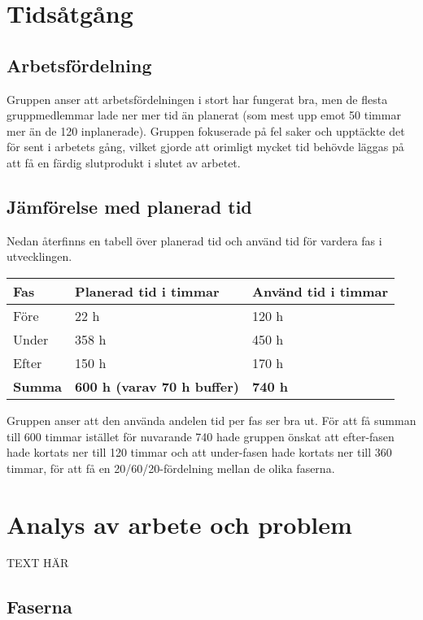 \documentclass[10pt,oneside,swedish]{lips}
\begin{document}
\cleardoublepage
{}\cfoot{\thepage}

\section{Tidsåtgång}
\subsection{Arbetsfördelning}

Gruppen anser att arbetsfördelningen i stort har fungerat bra, men de flesta
gruppmedlemmar lade ner mer tid än planerat (som mest upp emot 50 timmar mer än
de 120 inplanerade). Gruppen fokuserade på fel saker och upptäckte det för sent i
arbetets gång, vilket gjorde att orimligt mycket tid behövde läggas på att få en
färdig slutprodukt i slutet av arbetet. 

\subsection{Jämförelse med planerad tid}

Nedan återfinns en tabell över planerad tid och använd tid för vardera fas i
utvecklingen. 

\begin{tabular}{|l|l|l|} \hline
	\textbf{Fas} & \textbf{Planerad tid i timmar} & \textbf{Använd tid i timmar} \\\hline
	Före & 22 h & 120 h \\\hline
	Under & 358 h & 450 h \\\hline
	Efter & 150 h & 170 h \\\hline
	\textbf{Summa} & \textbf{600 h (varav 70 h buffer)} & \textbf{740 h} \\\hline
\end{tabular}

Gruppen anser att den använda andelen tid per fas ser bra ut. För att få summan
till 600 timmar istället för nuvarande 740 hade gruppen önskat att efter-fasen
hade kortats ner till 120 timmar och att under-fasen hade kortats ner till 360
timmar, för att få en 20/60/20-fördelning mellan de olika faserna.

\section{Analys av arbete och problem}

TEXT HÄR

\subsection{Faserna}
\end{document}
